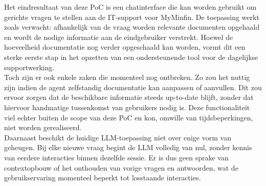 
Het eindresultaat van deze PoC is een chatinterface die kan worden gebruikt om gerichte vragen te stellen aan de IT-support voor MyMinfin. De toepassing werkt zoals verwacht: afhankelijk van de vraag worden relevante documenten opgehaald en wordt de nodige informatie aan de eindgebruiker verstrekt. Hoewel de hoeveelheid documentatie nog verder opgeschaald kan worden, vormt dit een sterke eerste stap in het opzetten van een ondersteunende tool voor de dagelijkse supportwerking.
\\[1em]
Toch zijn er ook enkele zaken die momenteel nog ontbreken. Zo zou het nuttig zijn indien de agent zelfstandig documentatie kan aanpassen of aanvullen. Dit zou ervoor zorgen dat de beschikbare informatie steeds up-to-date blijft, zonder dat hiervoor handmatige tussenkomst van gebruikers nodig is. Deze functionaliteit viel echter buiten de scope van deze PoC en kon, omwille van tijdsbeperkingen, niet worden gerealiseerd.
\\[1em]
Daarnaast beschikt de huidige LLM-toepassing niet over enige vorm van geheugen. Bij elke nieuwe vraag begint de LLM volledig van nul, zonder kennis van eerdere interacties binnen dezelfde sessie. Er is dus geen sprake van contextopbouw of het onthouden van vorige vragen en antwoorden, wat de gebruikservaring momenteel beperkt tot losstaande interacties.